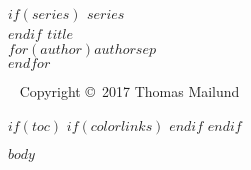 \documentclass[11pt,twoside,openright]{memoir}
\begin{document}

\begingroup
\thispagestyle{empty}
{\bfseries\sffamily\noindent
$if(series)$ {\Large $series$}\\[50pt]$endif$ %
{\Huge $title$}\\[35pt] %
{\huge $for(author)$$author$$sep$\\$endfor$} %
}
\vfill
\endgroup



\newpage
~\vfill
\thispagestyle{empty}
\noindent Copyright \copyright\ 2017 Thomas Mailund\\ %
\clearpage


$if(toc)$
$if(colorlinks)$
\hypersetup{linkcolor=$if(toccolor)$$toccolor$$else$black$endif$}
$endif$
\setcounter{tocdepth}{1}
\pagestyle{empty} %
\tableofcontents %
\cleardoublepage %
$endif$



\pagestyle{Ruled}
$body$

\end{document}
